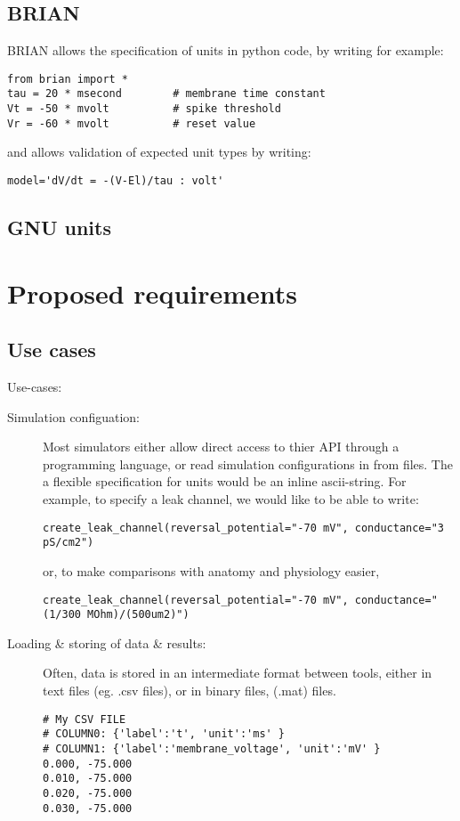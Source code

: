 \documentclass{article}
\begin{document}
\subsection*{BRIAN}
BRIAN allows the specification of units in python code, by writing for example:

\begin{lstlisting}
from brian import *
tau = 20 * msecond        # membrane time constant
Vt = -50 * mvolt          # spike threshold
Vr = -60 * mvolt          # reset value
\end{lstlisting}

and allows validation of expected unit types by writing:
\begin{lstlisting}
model='dV/dt = -(V-El)/tau : volt'
\end{lstlisting}


\subsection*{GNU units}




\newpage
\section*{Proposed requirements} 
\subsection{Use cases}
Use-cases:

\begin{description}
\item[Simulation configuation:]
Most simulators either allow direct access to thier API through a programming language, or read simulation configurations in from files. The a flexible specification for units would be an inline ascii-string.  For example, to specify a leak channel, we would like to be able to write:
\begin{lstlisting}
create_leak_channel(reversal_potential="-70 mV", conductance="3 pS/cm2")
\end{lstlisting}
or, to make comparisons with anatomy and physiology easier,
\begin{lstlisting}
create_leak_channel(reversal_potential="-70 mV", conductance="(1/300 MOhm)/(500um2)")
\end{lstlisting}


\item[Loading \& storing of data \& results:] 


Often, data is stored in an intermediate format between tools, either in text files (eg. .csv files), or in binary files, (.mat) files. 

\begin{verbatim}
# My CSV FILE
# COLUMN0: {'label':'t', 'unit':'ms' }
# COLUMN1: {'label':'membrane_voltage', 'unit':'mV' }
0.000, -75.000
0.010, -75.000
0.020, -75.000
0.030, -75.000
\end{verbatim}

\end{description}
\end{document}
